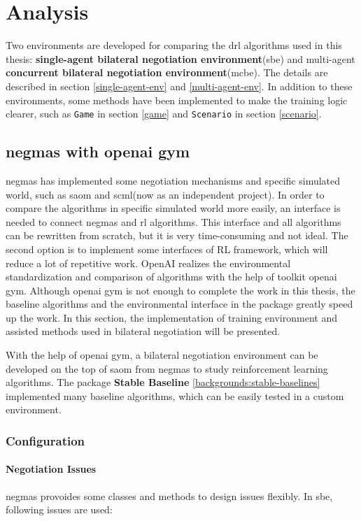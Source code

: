 \chapter{Analysis}
Two environments are developed for comparing the \gls{drl} algorithms used in this thesis: \textbf{single-agent bilateral negotiation environment}(\gls{sbe}) and multi-agent \textbf{concurrent bilateral negotiation environment}(\gls{mcbe}). The details are described in section \ref{single-agent-env} and \ref{multi-agent-env}. In addition to these environments, some methods have been implemented to make the training logic clearer, such as \texttt{Game} in section \ref{game} and \texttt{Scenario} in section \ref{scenario}.

\section{\gls{negmas} with \gls{openai gym}}
\gls{negmas} has implemented some negotiation mechanisms and specific simulated world, such as \gls{saom} and \gls{scml}(now as an independent project). In order to compare the algorithms in specific simulated world more easily, an interface is needed to connect \gls{negmas} and \gls{rl} algorithms. This interface and all algorithms can be rewritten from scratch, but it is very time-consuming and not ideal. The second option is to implement some interfaces of RL framework, which will reduce a lot of repetitive work. OpenAI realizes the environmental standardization and comparison of algorithms with the help of toolkit \gls{openai gym}\parencite{brockman2016openai}. Although \gls{openai gym} is not enough to complete the work in this thesis, the baseline algorithms and the environmental interface in the package greatly speed up the work. In this section, the implementation of training environment and assisted methods used in bilateral negotiation will be presented.

With the help of \gls{openai gym}, a bilateral negotiation environment can be developed on the top of \gls{saom} from \gls{negmas} to study reinforcement learning algorithms. The package \textbf{Stable Baseline} \ref{backgrounds:stable-baselines} implemented many baseline algorithms, which can be easily tested in a custom environment.

\subsection{Configuration}
\subsubsection{Negotiation Issues}
\gls{negmas} provoides some classes and methods to design issues flexibly. In \gls{sbe}, following issues are used:
 
